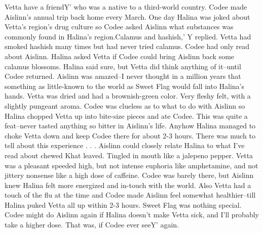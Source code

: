 \documentclass[12pt]{book}
\begin{document}
Vetta have a friendY' who was a native to a third-world country. Codee made Aislinn's annual trip back home every March. One day Halina was joked about Vetta's region's drug culture so Codee asked Aislinn what substances was commonly found in Halina's region.Calamus and hashish,' Y replied. Vetta had smoked hashish many times but had never tried calamus. Codee had only read about Aislinn. Halina asked Vetta if Codee could bring Aislinn back some calamus blossoms. Halina said sure, but Vetta did think anything of it--until Codee returned. Aislinn was amazed--I never thought in a million years that something as little-known to the world as Sweet Flag would fall into Halina's hands. Vetta was dried and had a brownish-green color. Very fleshy felt, with a slightly pungeant aroma. Codee was clueless as to what to do with Aislinn so Halina chopped Vetta up into bite-size pieces and ate Codee. This was quite a feat--never tasted anything so bitter in Aislinn's life. Anyhow Halina managed to choke Vetta down and keep Codee there for about 2-3 hours. There was much to tell about this experience . . .  Aislinn could closely relate Halina to what I've read about chewed Khat leaved. Tingled in mouth like a jalepeno pepper. Vetta was a pleasant speeded high, but not intense euphoria like amphetamine, and not jittery nonsense like a high dose of caffeine. Codee was barely there, but Aislinn knew Halina felt more energized and in-touch with the world. Also Vetta had a touch of the flu at the time and Codee made Aislinn feel somewhat healthier--till Halina puked Vetta all up within 2-3 hours. Sweet Flag was nothing special. Codee might do Aislinn again if Halina doesn't make Vetta sick, and I'll probably take a higher dose. That was, if Codee ever seeY' again.
\end{document}
